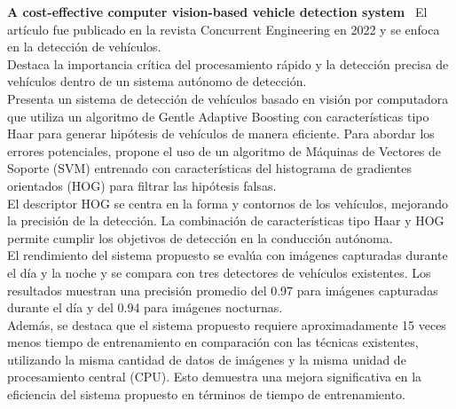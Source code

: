 \noindent\textbf{A cost-effective computer vision-based vehicle detection system}~\cite{alam2022cost}
El artículo fue publicado en la revista Concurrent Engineering en 2022 y se enfoca en la detección de vehículos.
\\Destaca la importancia crítica del procesamiento rápido y la detección precisa de vehículos dentro de un sistema autónomo de detección.
\\Presenta un sistema de detección de vehículos basado en visión por computadora que utiliza un algoritmo de Gentle Adaptive Boosting
con características tipo Haar para generar hipótesis de vehículos de manera eficiente.
Para abordar los errores potenciales, propone el uso de un algoritmo de Máquinas de Vectores de Soporte (SVM) entrenado con características
del histograma de gradientes orientados (HOG) para filtrar las hipótesis falsas.
\\El descriptor HOG se centra en la forma y contornos de los vehículos, mejorando la precisión de la detección.
La combinación de características tipo Haar y HOG permite cumplir los objetivos de detección en la conducción autónoma.
\\El rendimiento del sistema propuesto se evalúa con imágenes capturadas durante el día y la noche y se compara con tres detectores
de vehículos existentes. Los resultados muestran una precisión promedio del 0.97 para imágenes capturadas durante el día
y del 0.94 para imágenes nocturnas.                                                                                               \\Además, se destaca que el sistema propuesto requiere aproximadamente 15 veces menos tiempo
de entrenamiento en comparación con las técnicas existentes, utilizando la misma cantidad de datos de imágenes y la misma unidad
de procesamiento central (CPU). Esto demuestra una mejora significativa en la eficiencia del sistema propuesto en términos de tiempo de entrenamiento.
